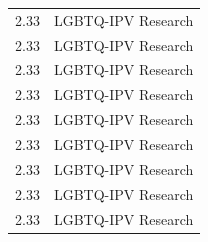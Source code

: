 \documentclass[]{tufte-handout}
\begin{document}
\begin{longtable}[]{@{}ll@{}}
\begin{minipage}[t]{0.09\columnwidth}
2.33\strut
\end{minipage} & \begin{minipage}[t]{0.26\columnwidth}\raggedright\strut
LGBTQ-IPV Research\strut
\end{minipage}\tabularnewline
\begin{minipage}[t]{0.09\columnwidth}\raggedright\strut
2.33\strut
\end{minipage} & \begin{minipage}[t]{0.26\columnwidth}\raggedright\strut
LGBTQ-IPV Research\strut
\end{minipage}\tabularnewline
\begin{minipage}[t]{0.09\columnwidth}\raggedright\strut
2.33\strut
\end{minipage} & \begin{minipage}[t]{0.26\columnwidth}\raggedright\strut
LGBTQ-IPV Research\strut
\end{minipage}\tabularnewline
\begin{minipage}[t]{0.09\columnwidth}\raggedright\strut
2.33\strut
\end{minipage} & \begin{minipage}[t]{0.26\columnwidth}\raggedright\strut
LGBTQ-IPV Research\strut
\end{minipage}\tabularnewline
\begin{minipage}[t]{0.09\columnwidth}\raggedright\strut
2.33\strut
\end{minipage} & \begin{minipage}[t]{0.26\columnwidth}\raggedright\strut
LGBTQ-IPV Research\strut
\end{minipage}\tabularnewline
\begin{minipage}[t]{0.09\columnwidth}\raggedright\strut
2.33\strut
\end{minipage} & \begin{minipage}[t]{0.26\columnwidth}\raggedright\strut
LGBTQ-IPV Research\strut
\end{minipage}\tabularnewline
\begin{minipage}[t]{0.09\columnwidth}\raggedright\strut
2.33\strut
\end{minipage} & \begin{minipage}[t]{0.26\columnwidth}\raggedright\strut
LGBTQ-IPV Research\strut
\end{minipage}\tabularnewline
\begin{minipage}[t]{0.09\columnwidth}\raggedright\strut
2.33\strut
\end{minipage} & \begin{minipage}[t]{0.26\columnwidth}\raggedright\strut
LGBTQ-IPV Research\strut
\end{minipage}\tabularnewline
\begin{minipage}[t]{0.09\columnwidth}\raggedright\strut
2.33\strut
\end{minipage} & \begin{minipage}[t]{0.26\columnwidth}\raggedright\strut
LGBTQ-IPV Research\strut
\end{minipage}\tabularnewline
\bottomrule
\end{longtable}
\end{document}
